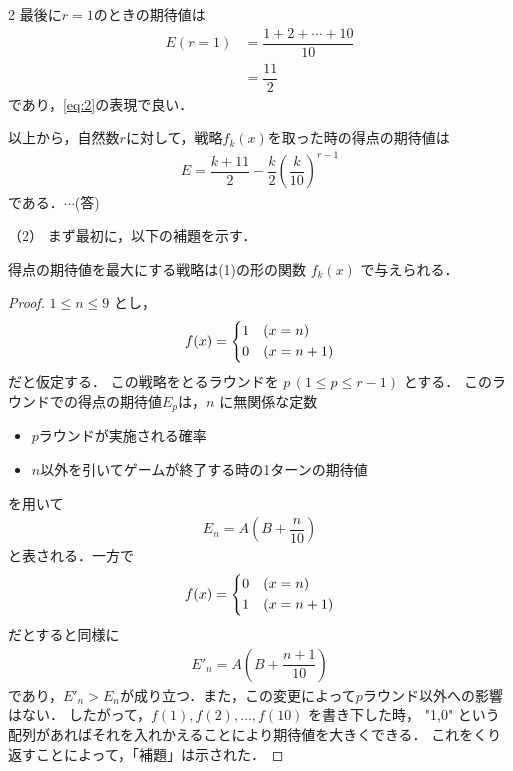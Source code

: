 \documentclass[../../main.tex]{subfiles}
\begin{document}
\begin{multicols}{2}
  最後に$r=1$のときの期待値は
  \begin{align}
    E(r=1)
    & = \dfrac{1+2+\cdots + 10}{10} \\
    & =\dfrac{11}{2}
  \end{align}
  であり，\cref{eq:2}の表現で良い．

  以上から，自然数$r$に対して，戦略$f_k(x)$を取った時の得点の期待値は
  \begin{align}
    E = \dfrac{k+11}{2} - \dfrac{k}{2} \left(\dfrac{k}{10}\right)^{r-1}
  \end{align}
  である．$\cdots$(答)

  （2）
  まず最初に，以下の補題を示す．

  \begin{lemma}
    得点の期待値を最大にする戦略は(1)の形の関数 $f_{k}(x)$ で与えられる．
  \end{lemma}

  \begin{proof}
    $1 \le n \le 9$ とし，
    \begin{align}
      f(x)=
      \begin{dcases}
        1 & (x=n)   \\
        0 & (x=n+1)
      \end{dcases}
    \end{align}
    だと仮定する．
    この戦略をとるラウンドを $p\, (1 \le p \le r-1)$ とする．
    このラウンドでの得点の期待値$E_p$は，$n$ に無関係な定数
    \begin{itemize}
      \item[$A$] $p$ラウンドが実施される確率
      \item[$B$] $n$以外を引いてゲームが終了する時の1ターンの期待値
    \end{itemize}
    を用いて
    \begin{align}
      E_n = A\left(B+\dfrac{n}{10}\right)
    \end{align}
    と表される．一方で
    \begin{align}
      f(x)=
      \begin{dcases}
        0 & (x=n)   \\
        1 & (x=n+1)
      \end{dcases}
    \end{align}
    だとすると同様に
    \begin{align}
      E'_n = A\left(B+\dfrac{n+1}{10}\right)
    \end{align}
    であり，$E'_n>E_n$が成り立つ．また，この変更によって$p$ラウンド以外への影響はない．
    したがって，$f(1), f(2), \dots, f(10)$ を書き下した時， "1,0" という配列があればそれを入れかえることにより期待値を大きくできる．
    これをくり返すことによって，「補題」は示された．
  \end{proof}


\end{multicols}
\end{document}
